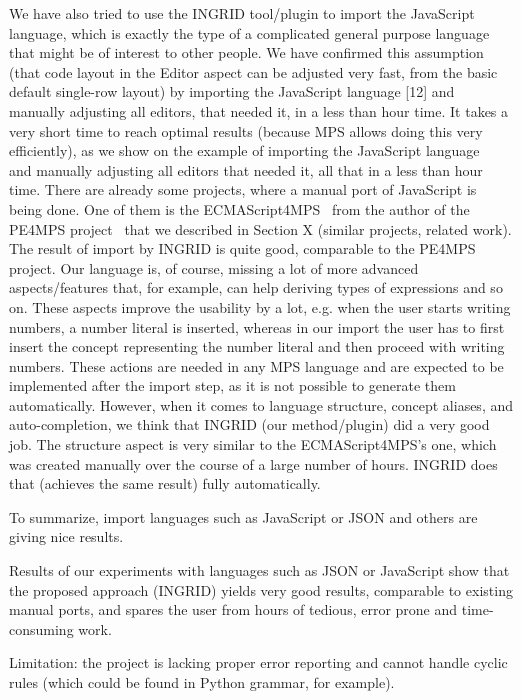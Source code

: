 We have also tried to use the INGRID tool/plugin to import the JavaScript language, which is exactly the type of a complicated general purpose language that might be of interest to other people.
We have confirmed this assumption (that code layout in the Editor aspect can be adjusted very fast, from the basic default single-row layout) by importing the JavaScript language [12] and manually adjusting all editors, that needed it, in a less than hour time.
It takes a very short time to reach optimal results (because MPS allows doing this very efficiently), as we show on the example of importing the JavaScript language~\cite{ref:javascript} and manually adjusting all editors that needed it, all that in a less than hour time.
There are already some projects, where a manual port of JavaScript is being done.
One of them is the ECMAScript4MPS~\cite{ref:ECMAScript4MPS} from the author of the PE4MPS project~\cite{ref:PE4MPS} that we described in Section X (similar projects, related work).
The result of import by INGRID is quite good, comparable to the PE4MPS project.
Our language is, of course, missing a lot of more advanced aspects/features that, for example, can help deriving types of expressions and so on.
These aspects improve the usability by a lot, e.g. when the user starts writing numbers, a number literal is inserted, whereas in our import the user has to first insert the concept representing the number literal and then proceed with writing numbers.
These actions are needed in any MPS language and are expected to be implemented after the import step,  as it is not possible to generate them automatically.
However, when it comes to language structure, concept aliases, and auto-completion, we think that INGRID (our method/plugin) did a very good job.
The structure aspect is very similar to the ECMAScript4MPS's one, which was created manually over the course of a large number of hours.
INGRID does that (achieves the same result) fully automatically.

To summarize, import languages such as JavaScript or JSON and others are giving nice results.

Results of our experiments with languages such as JSON or JavaScript show that the proposed approach (INGRID) yields very good results, comparable to existing manual ports, and spares the user from hours of tedious, error prone and time-consuming work.

Limitation: the project is lacking proper error reporting and cannot handle cyclic rules (which could be found in Python grammar, for example).
